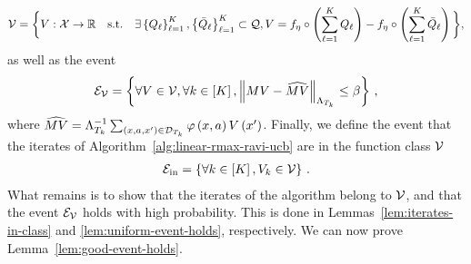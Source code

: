 %
\begin{equation} \label{eq:function-class-v}
    \mathcal{V} = \bigg\{ V: \mathcal{X} \rightarrow \mathbb{R} \quad \text{s.t.} \quad\exists \left\{ Q_\ell \right\}_{\ell=1}^K, \left\{ \bar{Q}_\ell \right\}_{\ell=1}^K \subset \mathcal{Q}, V = f_\eta \circ \left( \sum^K_{\ell=1} Q_\ell \right) - f_\eta \circ \left( \sum^K_{\ell=1} \bar{Q}_\ell \right) \bigg\},
\end{equation}
%
as well as the event
%
\begin{equation*}
    \mathcal{E}_{\mathcal{V}} = \left\{ \forall V \in \mathcal{V}, \forall k \in \left[ K \right], \left\|M V - \widehat{M V}\right\|_{\Lambda_{T_k}} \leq \beta \right\}\,,
\end{equation*}
where $\widehat{M V} = \Lambda_{T_k}^{-1} \sum_{\left( x, a, x' \right) \in \mathcal{D}_{T_k}} \varphi \left( x, a \right)  V \left( x' \right)$. Finally, we define the event that the iterates of Algorithm~\ref{alg:linear-rmax-ravi-ucb} are in the function class $\mathcal{V}$
%
\begin{align*}
    \mathcal{E}_{\mathrm{in}} = \left\{ \forall k \in \left[ K \right], V_k \in \mathcal{V} \right\}\,.
\end{align*}
%
What remains is to show that the iterates of the algorithm belong to $\mathcal{V}$, and that the event $\mathcal{E}_{\mathcal{V}}$ holds with high probability. This is done in Lemmas~\ref{lem:iterates-in-class} and \ref{lem:uniform-event-holds}, respectively. We can now prove Lemma~\ref{lem:good-event-holds}.


\goodeventholds*

